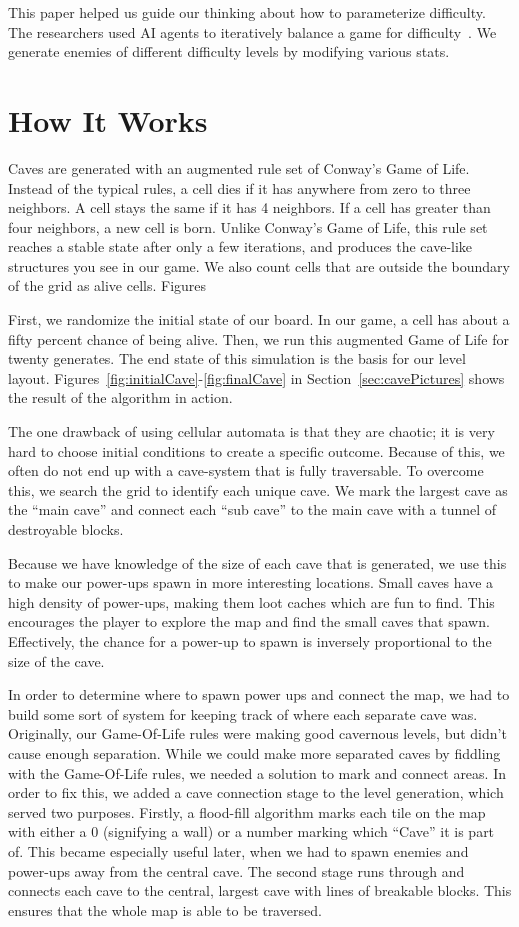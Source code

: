 \documentclass[a4paper, 12pt]{article}
\begin{document}
This paper helped us guide our thinking about how to parameterize difficulty.
The researchers used AI agents to iteratively balance a game for
difficulty~\autocite{liu2017}. We generate enemies of different difficulty
levels by modifying various stats.

\section{How It Works}

Caves are generated with an augmented rule set of Conway's Game of Life. Instead
of the typical rules, a cell dies if it has anywhere from zero to three
neighbors. A cell stays the same if it has 4 neighbors. If a cell has greater
than four neighbors, a new cell is born. Unlike Conway's Game of Life, this rule
set reaches a stable state after only a few iterations, and produces the
cave-like structures you see in our game. We also count cells that are outside
the boundary of the grid as alive cells. Figures

First, we randomize the initial state of our board. In our game, a cell has
about a fifty percent chance of being alive. Then, we run this augmented Game of
Life for twenty generates. The end state of this simulation is the basis for our
level layout. Figures~\ref{fig:initialCave}-\ref{fig:finalCave} in
Section~\ref{sec:cavePictures} shows the result of the algorithm in action.

The one drawback of using cellular automata is that they are chaotic; it is very
hard to choose initial conditions to create a specific outcome. Because of this,
we often do not end up with a cave-system that is fully traversable. To overcome
this, we search the grid to identify each unique cave. We mark the largest cave
as the ``main cave'' and connect each ``sub cave'' to the main cave with a
tunnel of destroyable blocks.

Because we have knowledge of the size of each cave that is generated, we use
this to make our power-ups spawn in more interesting locations. Small caves have
a high density of power-ups, making them loot caches which are fun to find. This
encourages the player to explore the map and find the small caves that spawn.
Effectively, the chance for a power-up to spawn is inversely proportional to the
size of the cave.

In order to determine where to spawn power ups and connect the map, we had to
build some sort of system for keeping track of where each separate cave was.
Originally, our Game-Of-Life rules were making good cavernous levels, but didn't
cause enough separation. While we could make more separated caves by fiddling
with the Game-Of-Life rules, we needed a solution to mark and connect areas. In
order to fix this, we added a cave connection stage to the level generation,
which served two purposes.  Firstly, a flood-fill algorithm marks each tile on
the map with either a 0 (signifying a wall) or a number marking which ``Cave''
it is part of. This became especially useful later, when we had to spawn enemies
and power-ups away from the central cave. The second stage runs through and
connects each cave to the central, largest cave with lines of breakable blocks.
This ensures that the whole map is able to be traversed.
\end{document}

